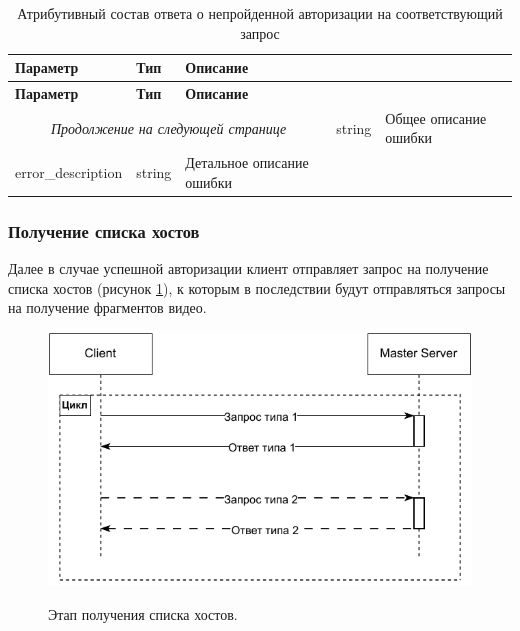\begin{longtable}{|p{4cm}|p{2cm}|p{9.5cm}|}
	\caption{Атрибутивный состав ответа о непройденной авторизации на соответствующий запрос}\label{tbl:auth_response_err}\\
	\hline
	
	\textbf{Параметр} & \textbf{Тип} & \textbf{Описание}\\ 
	\hline
	\endfirsthead
	
	\hline
	\textbf{Параметр} & \textbf{Тип} & \textbf{Описание}\\ 
	\hline
	\endhead
	
	\hline
	\multicolumn{3}{c}{\textit{Продолжение на следующей странице}}
	\endfoot
	\hline
	\endlastfoot
	
	error &
	string & 
	Общее описание ошибки \\
	
	\hline
	error\_description & 
	string & 
	Детальное описание ошибки \\
\end{longtable}

\subsubsection{Получение списка хостов}
Далее в случае успешной авторизации клиент отправляет запрос на получение списка хостов (рисунок \ref{image:get_hosts_request}), к которым в последствии будут отправляться запросы на получение фрагментов видео.  

\begin{figure}[h!]
	\begin{center}
		{\includegraphics[scale = 1]{img/[items][master][share].pdf}}
		\caption{Этап получения списка хостов.}
		\label{image:get_hosts_request}
	\end{center}
\end{figure}


